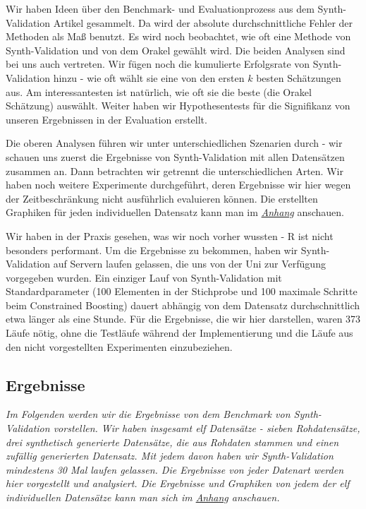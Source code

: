 \documentclass[12pt,a4paper,twoside]{scrartcl}
\numberwithin{equation}{section}
\begin{document}
\noindent
Wir haben Ideen über den Benchmark- und Evaluationprozess aus dem Synth-Validation Artikel \cite{schuler2017synth} gesammelt. Da wird der absolute durchschnittliche Fehler der Methoden als Maß benutzt. Es wird noch beobachtet, wie oft eine Methode von Synth-Validation und von dem Orakel gewählt wird. Die beiden Analysen sind bei uns auch vertreten. Wir fügen noch die kumulierte Erfolgsrate von Synth-Validation hinzu - wie oft wählt sie eine von den ersten $k$ besten Schätzungen aus. Am interessantesten ist natürlich, wie oft sie die beste (die Orakel Schätzung) auswählt. Weiter haben wir Hypothesentests für die Signifikanz von unseren Ergebnissen in der Evaluation erstellt. \par  

\noindent
Die oberen Analysen führen wir unter unterschiedlichen Szenarien durch - wir schauen uns zuerst die Ergebnisse von Synth-Validation mit allen Datensätzen zusammen an. Dann betrachten wir getrennt die unterschiedlichen Arten. Wir haben noch weitere Experimente durchgeführt, deren Ergebnisse wir hier wegen der Zeitbeschränkung nicht ausführlich evaluieren können. Die erstellten Graphiken für jeden individuellen Datensatz kann man im \emph{\hyperref[anhang]{Anhang}} anschauen. \par

\noindent
Wir haben in der Praxis gesehen, was wir noch vorher wussten - R ist nicht besonders performant. Um die Ergebnisse zu bekommen, haben wir Synth-Validation auf Servern laufen gelassen, die uns von der Uni zur Verfügung vorgegeben wurden. Ein einziger Lauf von Synth-Validation mit Standardparameter (100 Elementen in der Stichprobe und 100 maximale Schritte beim Constrained Boosting) dauert abhängig von dem Datensatz durchschnittlich etwa länger als eine Stunde. Für die Ergebnisse, die wir hier darstellen, waren 373 Läufe nötig, ohne die Testläufe während der Implementierung und die Läufe aus den nicht vorgestellten Experimenten einzubeziehen. \par  

\subsection{Ergebnisse}\label{subsec:ergebnisse} 
\noindent
\emph{Im Folgenden werden wir die Ergebnisse von dem Benchmark von Synth-Validation vorstellen. Wir haben insgesamt elf Datensätze - sieben Rohdatensätze, drei synthetisch generierte Datensätze, die aus Rohdaten stammen und einen zufällig generierten Datensatz. Mit jedem davon haben wir Synth-Validation mindestens 30 Mal laufen gelassen. Die Ergebnisse von jeder Datenart werden hier vorgestellt und analysiert. Die Ergebnisse und Graphiken von jedem der elf individuellen Datensätze kann man sich im \emph{\hyperref[anhang]{Anhang}} anschauen.}\par
\end{document}
